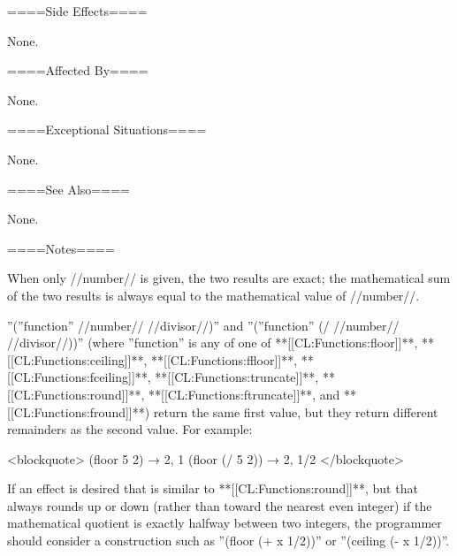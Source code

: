 ====Side Effects====

None.

====Affected By====

None.

====Exceptional Situations====

None.

====See Also====

None.

====Notes====

When only //number// is given, the two results are exact; the mathematical sum of the two results is always equal to the mathematical value of //number//.

''(''function'' //number// //divisor//)'' and ''(''function'' (/ //number// //divisor//))'' (where ''function'' is any of one of **[[CL:Functions:floor]]**, **[[CL:Functions:ceiling]]**, **[[CL:Functions:ffloor]]**, **[[CL:Functions:fceiling]]**, **[[CL:Functions:truncate]]**, **[[CL:Functions:round]]**, **[[CL:Functions:ftruncate]]**, and **[[CL:Functions:fround]]**) return the same first value, but they return different remainders as the second value. For example:

<blockquote> (floor 5 2) → 2, 1 (floor (/ 5 2)) → 2, 1/2 </blockquote>

If an effect is desired that is similar to **[[CL:Functions:round]]**, but that always rounds up or down (rather than toward the nearest even integer) if the mathematical quotient is exactly halfway between two integers, the programmer should consider a construction such as ''(floor (+ x 1/2))'' or ''(ceiling (- x 1/2))''.

